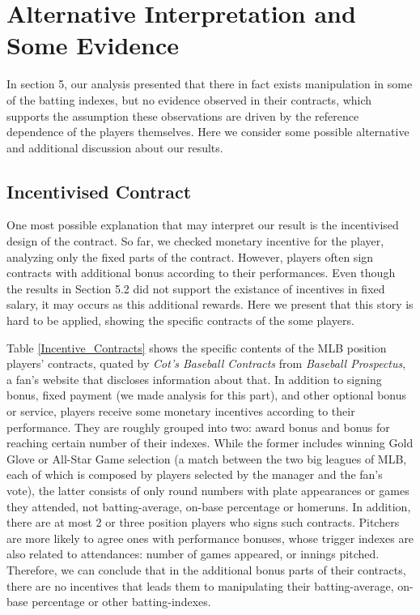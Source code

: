 \documentclass[dvipdfmx, 12pt]{article}
\begin{document}
\section{Alternative Interpretation and Some Evidence}

In section 5, our analysis presented that there in fact exists manipulation in some of the batting indexes, but no evidence observed in their contracts, which supports the assumption these observations are driven by the reference dependence of the players themselves. Here we consider some possible alternative and additional discussion about our results.

\subsection{Incentivised Contract}

One most possible explanation that may interpret our result is the incentivised design of the contract. So far, we checked monetary incentive for the player, analyzing only the fixed parts of the contract. However, players often sign contracts with additional bonus according to their performances. Even though the results in Section 5.2 did not support the existance of incentives in fixed salary, it may occurs as this additional rewards. Here we present that this story is hard to be applied, showing the specific contracts of the some players.

Table \ref{Incentive_Contracts} shows the specific contents of the MLB position players' contracts, quated by \textit{Cot's Baseball Contracts} from \textit{Baseball Prospectus}, a fan's website that discloses information about that. In addition to signing bonus, fixed payment (we made analysis for this part), and other optional bonus or service, players receive some monetary incentives according to their performance. They are roughly grouped into two: award bonus and bonus for reaching certain number of their indexes. While the former includes winning Gold Glove or All-Star Game selection (a match between the two big leagues of MLB, each of which is composed by players selected by the manager and the fan's vote), the latter consists of only round numbers with plate appearances or games they attended, not batting-average, on-base percentage or homeruns. In addition, there are at most 2 or three position players who signs such contracts. Pitchers are more likely to agree ones with performance bonuses, whose trigger indexes are also related to attendances: number of games appeared, or innings pitched. Therefore, we can conclude that in the additional bonus parts of their contracts, there are no incentives that leads them to manipulating  their batting-average, on-base percentage or other batting-indexes.
\end{document}
